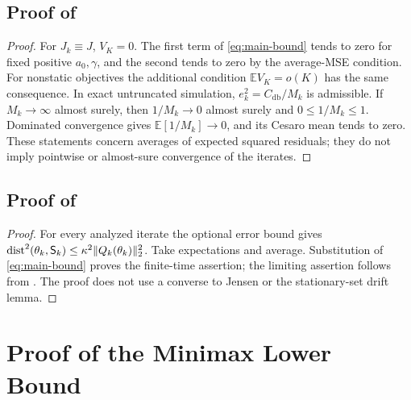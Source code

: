\documentclass[11pt]{article}
\newcommand{\E}{\mathbb E}
\newcommand{\1}{\mathbf 1}
\newcommand{\dist}{\operatorname{dist}}
\DeclarePairedDelimiter{\norm}{\lVert}{\rVert}
\newcommand{\Sta}{\mathsf S}
\newcommand{\db}{\mathrm{db}}
\theoremstyle{definition}
\begin{document}
\subsection{Proof of \texorpdfstring{}{the static-limit corollary}}
\begin{proof}
For $J_k\equiv J$, $V_K=0$. The first term of \eqref{eq:main-bound} tends to zero for fixed positive $a_0,\gamma$, and the second tends to zero by the average-MSE condition. For nonstatic objectives the additional condition $\E V_K=o(K)$ has the same consequence. In exact untruncated simulation, $e_k^2=C_{\db}/M_k$ is admissible. If $M_k\to\infty$ almost surely, then $1/M_k\to0$ almost surely and $0\le1/M_k\le1$. Dominated convergence gives $\E[1/M_k]\to0$, and its Cesaro mean tends to zero. These statements concern averages of expected squared residuals; they do not imply pointwise or almost-sure convergence of the iterates.
\end{proof}

\subsection{Proof of \texorpdfstring{}{the set-tracking corollary}}
\begin{proof}
For every analyzed iterate the optional error bound gives
$\dist^2(\theta_k,\Sta_k)\le\kappa^2\norm{Q_k(\theta_k)}_2^2$.
Take expectations and average. Substitution of \eqref{eq:main-bound} proves the finite-time assertion; the limiting assertion follows from . The proof does not use a converse to Jensen or the stationary-set drift lemma.
\end{proof}

\section{Proof of the Minimax Lower Bound}\label{app:minimax-proof}
\end{document}
